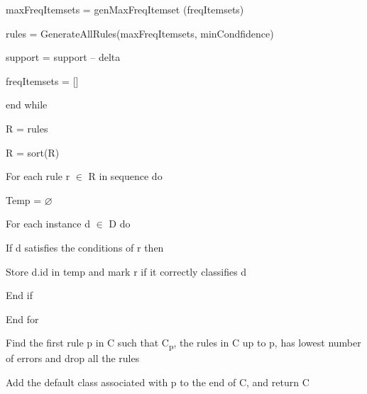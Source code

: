 \documentclass[12pt]{article}
\renewcommand{\_}{\kern-1.5pt\textunderscore\kern-1.5pt}
\begin{document}
\begin{adjustwidth}{0.5in}{0.0in}
maxFreqItemsets = genMaxFreqItemset (freqItemsets)\par

\end{adjustwidth}

\begin{adjustwidth}{0.5in}{0.0in}
rules = GenerateAllRules(maxFreqItemsets, minCondfidence)\par

\end{adjustwidth}

\begin{adjustwidth}{0.5in}{0.0in}
support = support – delta\par

\end{adjustwidth}

\begin{adjustwidth}{0.5in}{0.0in}
freqItemsets = []\par

\end{adjustwidth}

end while\par


\vspace{\baselineskip}
R = rules\par

R = sort(R)\par

For each rule r $ \in $  R in sequence do\par

\tab Temp = $ \varnothing $ \par

\tab For each instance d $ \in $  D do\par

\tab If d satisfies the conditions of r then\par

\tab \tab Store d.id in temp and mark r if it correctly classifies d\par

\tab End if\par

End for\par

Find the first rule p in C such that C\textsubscript{p}, the rules in C up to p, has lowest number of errors and drop all the rules\par

Add the default class associated with p to the end of C, and return C\par
\end{document}
